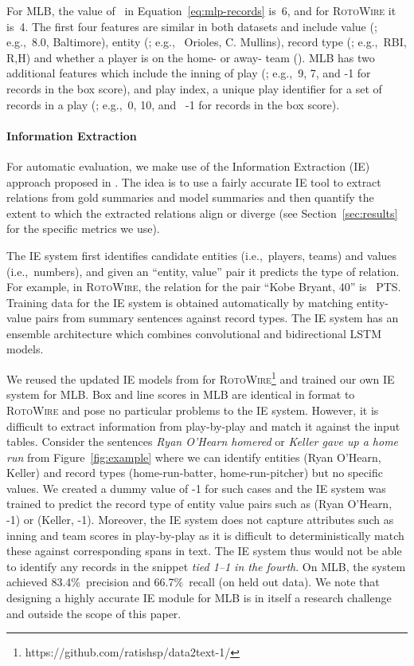 \documentclass[11pt,a4paper]{article}
\newcommand{\lform}[1]{\textsf{\scriptsize{#1}}}
\begin{document}
For MLB, the value of~ in Equation~\eqref{eq:mlp-records} is~6, and
for \textsc{RotoWire} it is~4. The first four features are similar in
both datasets and include value (; e.g.,~\lform{\small 8.0},
\lform{\small Baltimore}), entity (; e.g.,~\lform{\small
  Orioles}, \lform{\small C. Mullins}), record type (;
e.g.,~\lform{\small RBI}, \lform{\small R},\lform{\small H}) and
whether a player is on the home- or away- team ().  MLB has
two additional features which include the inning of play (;
e.g.,~\lform{\small 9}, \lform{\small 7}, and \lform{\small -1} for
records in the box score), and play index, a unique play identifier
for a set of records in a play (; e.g.,~\lform{\small 0},
\lform{\small 10}, and ~\lform{\small -1} for records in the box
score).

\paragraph{Information Extraction}
For automatic evaluation, we make use of the Information Extraction
(IE) approach proposed in . The idea is to use a
fairly accurate IE tool to extract relations from gold summaries and
model summaries and then quantify the extent to which the extracted
relations align or diverge (see Section~\ref{sec:results} for the
specific metrics we use).

The IE system first identifies candidate entities (i.e.,~players,
teams) and values (i.e.,~numbers), and given an ``entity, value'' pair
it predicts the type of relation. For example, in \textsc{RotoWire},
the relation for the pair ``Kobe Bryant, 40'' is~\lform{\small
  PTS}. Training data for the IE system is obtained automatically by
matching entity-value pairs from summary sentences against record
types.  The IE system has an ensemble architecture which combines
convolutional and bidirectional LSTM models.

We reused the updated IE models from
\citet{DBLP:journals/corr/abs-1809-00582} for
\textsc{RotoWire}\footnote{https://github.com/ratishsp/data2text-1/}
and trained our own IE system for MLB.  Box and line scores in MLB are
identical in format to \textsc{RotoWire} and pose no particular
problems to the IE system. However, it is difficult to extract
information from play-by-play and match it against the input tables.
Consider the sentences \textsl{Ryan O'Hearn homered} or \textsl{Keller
  gave up a home run} from Figure~\ref{fig:example} where we can
identify entities (Ryan O'Hearn, Keller) and record types
(home-run-batter, home-run-pitcher) but no specific values.  We
created a dummy value of -1 for such cases and the IE system was
trained to predict the record type of entity value pairs such as (Ryan
O'Hearn, -1) or (Keller, -1). Moreover, the IE system does not capture
attributes such as inning and team scores in play-by-play as it is
difficult to deterministically match these against corresponding spans
in text.  The IE system thus would not be able to identify any records
in the snippet \textsl{tied 1--1 in the fourth}.  On MLB, the system
achieved 83.4\%~precision and 66.7\%~recall (on held out data). We
note that designing a highly accurate IE module for MLB is in itself a
research challenge and outside the scope of this paper.
\end{document}
